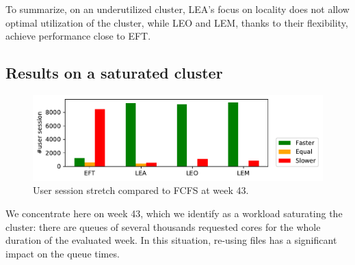 \documentclass[conference]{IEEEtran}
\newcommand{\rev}[1]{{\color{black}{#1}}}
\begin{document}
To summarize, on an underutilized cluster, LEA's focus on locality
does not allow optimal utilization of the cluster, while LEO and LEM, thanks
to their flexibility, achieve performance close to EFT.


\subsection{Results on a saturated cluster}\label{sec.43}

\begin{figure}[t]\centering\includegraphics[width=1\linewidth]{../MBSS/plot/Boxplot/byuser/small_hist_stretch_10-24-10-30.pdf}\caption{User session stretch compared to FCFS at week 43.}\label{smallhist.43}\end{figure}

We concentrate here on week 43, which we identify as a workload saturating the cluster: there are queues of
several thousands requested cores for the whole duration of the evaluated week.
In this situation, re-using files has a significant impact
on the queue times.

\begin{table}
\caption{Percentage reduction in data transfer time relative to FCFS at week 43.}\label{tab.43}
\end{table}
\end{document}
